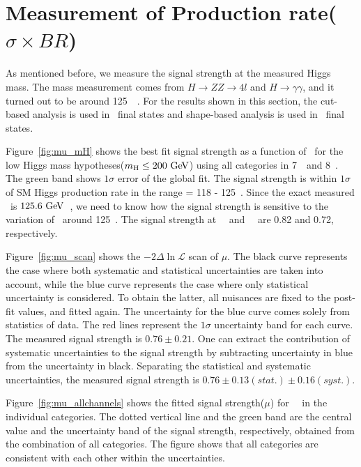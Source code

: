 \section{Measurement of Production rate($\sigma \times BR$)}
\label{sec:mu}

As mentioned before, we measure the signal strength at the 
measured Higgs mass. The mass measurement comes from 
$H\rightarrow ZZ\rightarrow4l$ and $H\rightarrow \gamma\gamma$, 
and it turned out to be around 125~\GeV~\cite{Chatrchyan:1637951, CMS-PAS-HIG-13-001}. 
For the results shown in this section,   
the cut-based analysis is used in \SF\ final states 
and shape-based analysis is used in \DF\ final states. 

Figure~\ref{fig:mu_mH} shows the best fit signal strength 
as a function of \mHi\ for the low Higgs mass hypotheses($m_{\mathrm{H}}\le200~\mathrm{Ge\kern -0.1em V}$)
using all categories in 7~\TeV\ and 8~\TeV. 
The green band shows $1\sigma$ error of the global fit. 
The signal strength is within $1\sigma$ of SM Higgs production rate 
in the range \mHi = 118 - 125~\GeV. 
Since the exact measured \mHi\ is $125.6~\mathrm{Ge\kern -0.1em V}$~\cite{Chatrchyan:1637951}, 
we need to know how the signal strength is sensitive to the 
variation of \mHi\ around 125~\GeV. 
The signal strength at ~\GeV\ and ~\GeV\ are 0.82 and 0.72, respectively.

Figure~\ref{fig:mu_scan} shows the  $- 2\Delta\ln \mathcal{L}$ scan of $\mu$. 
The black curve represents the case where both systematic and statistical 
uncertainties are taken into account, while the blue curve represents the case 
where only statistical uncertainty is considered. To obtain the latter,  
all nuisances are fixed to the post-fit values, and fitted again.  
The uncertainty for the blue curve comes solely from statistics of data. 
The red lines represent the $1\sigma$ uncertainty band for each curve. 
The measured signal strength is $0.76 \pm 0.21$.  
One can extract the contribution of systematic uncertainties to the signal strength
by subtracting uncertainty in blue from the uncertainty in black.
Separating the statistical and systematic uncertainties, 
the measured signal strength is $0.76 \pm 0.13(stat.) \pm 0.16(syst.)$.  

Figure~\ref{fig:mu_allchannels} shows the fitted signal strength($\mu$) 
for ~\GeV\ in the individual categories. 
The dotted vertical line and the green band are 
the central value and the uncertainty band of the signal strength, respectively, 
obtained from the combination of all categories. 
The figure shows that all categories are consistent with each other
within the uncertainties.

